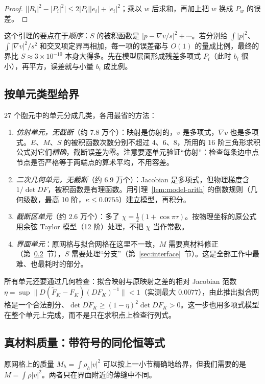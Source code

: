 \documentclass[11pt,a4paper,fontset=fandol]{ctexart}
\begin{document}
\begin{proof}
$\bigl||R_i|^2-|P_i|^2\bigr|\le2|P_i||e_i|+|e_i|^2$；乘以 $w$ 后求和，再加上把 $w$ 换成 $P_w$ 的误差。
\end{proof}

这个引理的要点在于\emph{顺序}：$S$ 的被积函数是 $|p-\nabla v/s|^2+\cdots$。若分别给 $\int|p|^2$、$\int|\nabla v|^2/s^2$ 和交叉项定界再相加，每一项的误差都与 $O(1)$ 的量成比例，最终的界比 $S\approx3\times10^{-10}$ 本身大得多。先在模型层面形成残差多项式 $P_i$（此时 $b_i$ 很小），再平方，误差就与小量 $b_i$ 成比例。

\subsection{按单元类型给界}

27 个胞元中的单元分成几类，各用最省的方法：
\begin{enumerate}
\item \emph{仿射单元，无截断}（约 7.8 万个）：映射是仿射的，$v$ 是多项式，$\nabla v$ 也是多项式。$E$、$M$、$S$ 的被积函数次数分别不超过 4、6、8，所用的 16 阶三角形求积公式对它们\emph{精确}，截断误差为零。注意要逐单元验证“仿射”：检查每条边中点节点是否严格等于两端点的算术平均，不用容差。
\item \emph{二次几何单元，无截断}（约 6.9 万个）：Jacobian 是多项式，但物理梯度含 $1/\det DF$，被积函数是有理函数。用引理~\ref{lem:model-arith} 的倒数规则（几何级数，最高 10 阶，$\kappa\le0.0755$）建立模型，再积分。
\item \emph{截断区单元}（约 2.6 万个）：多了 $\chi=\frac12(1+\cos\pi\tau)$。按物理坐标的原公式用余弦 Taylor 模型（12 阶）处理，不把 $\chi$ 当作常数。
\item \emph{界面单元}：原网格与拟合网格在这里不一致，$M$ 需要真材料修正（第~\ref{sec:mass}~节），$S$ 需要处理“分支”（第~\ref{sec:interface}~节）。这是全部工作中最难、也最耗时的部分。
\end{enumerate}
所有单元还要通过几何检查：拟合映射与原映射之差的相对 Jacobian 范数 $\eta=\sup\|D(\widetilde F_K-F_K)(DF_K)^{-1}\|<1$（实测最大 $0.0077$），由此推出拟合网格是一个合法剖分、$\det D\widetilde F_K\ge(1-\eta)^2\det DF_K>0$。这一步也用多项式模型在整个单元上完成，而不是只在求积点上检查行列式。

\subsection{真材料质量：带符号的同伦恒等式}
\label{sec:mass}

原网格上的质量 $M_h=\int\rho_h|v|^2$ 可以按上一小节精确地给界，但我们需要的是 $M=\int\rho|v|^2$。两者只在界面附近的薄缝中不同。
\end{document}
